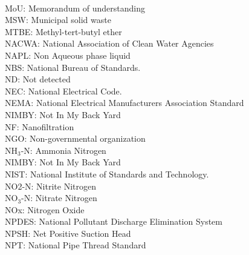 \documentclass{article}
\begin{document}
\vspace{0.3cm}\\
MoU:  Memorandum of understanding
\vspace{0.3cm}\\
MSW:  Municipal solid waste
\vspace{0.3cm}\\
MTBE:  Methyl-tert-butyl ether
\vspace{0.3cm}\\
NACWA:  National Association of Clean Water Agencies
\vspace{0.3cm}\\
NAPL:  Non Aqueous phase liquid
\vspace{0.3cm}\\
NBS:  National Bureau of Standards.
\vspace{0.3cm}\\
ND:  Not detected
\vspace{0.3cm}\\



NEC:  National Electrical Code.
\vspace{0.3cm}\\



NEMA:  National Electrical Manufacturers Association Standard
\vspace{0.3cm}\\
NIMBY:  Not In My Back Yard
\vspace{0.3cm}\\

NF:  Nanofiltration
\vspace{0.3cm}\\
NGO:  Non-governmental organization
\vspace{0.3cm}\\

NH$_3$-N:  Ammonia Nitrogen
\vspace{0.3cm}\\
NIMBY:  Not In My Back Yard
\vspace{0.3cm}\\
NIST:  National Institute of Standards and Technology.
\vspace{0.3cm}\\
NO2-N:  Nitrite Nitrogen 
\vspace{0.3cm}\\
NO$_3$-N:  Nitrate Nitrogen
\vspace{0.3cm}\\
NOx:  Nitrogen Oxide
\vspace{0.3cm}\\
NPDES:  National Pollutant Discharge Elimination System
\vspace{0.3cm}\\
NPSH:  Net Positive Suction Head
\vspace{0.3cm}\\
NPT:  National Pipe Thread Standard
\vspace{0.3cm}\\
\end{document}
